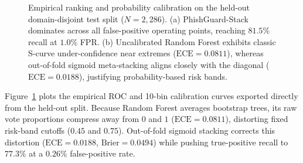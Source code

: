 \documentclass[conference]{IEEEtran}
\begin{document}
\begin{figure}[t]
\caption{Empirical ranking and probability calibration on the held-out domain-disjoint test split ($N=2{,}286$). (a) PhishGuard-Stack dominates across all false-positive operating points, reaching $81.5\%$ recall at $1.0\%$ FPR. (b) Uncalibrated Random Forest exhibits classic S-curve under-confidence near extremes ($\text{ECE}=0.0811$), whereas out-of-fold sigmoid meta-stacking aligns closely with the diagonal ($\text{ECE}=0.0188$), justifying probability-based risk bands.}
\label{fig:curves}
\end{figure}

Figure~\ref{fig:curves} plots the empirical ROC and 10-bin calibration curves exported directly from the held-out split. Because Random Forest averages bootstrap trees, its raw vote proportions compress away from $0$ and $1$ ($\text{ECE}=0.0811$), distorting fixed risk-band cutoffs ($0.45$ and $0.75$). Out-of-fold sigmoid stacking corrects this distortion ($\text{ECE}=0.0188$, $\text{Brier}=0.0494$) while pushing true-positive recall to $77.3\%$ at a $0.26\%$ false-positive rate.
\end{document}
